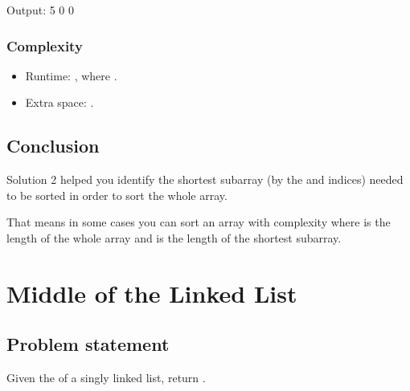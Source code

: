\documentclass[letterpaper,12pt,english]{book}
\begin{document}
\begin{sphinxVerbatim}[commandchars=\\\{\}]
Output:
5
0
0
\end{sphinxVerbatim}


\subsubsection{Complexity}
\label{\detokenize{Two_Pointers/08_TP_581_Shortest_Unsorted_Continuous_Subarray:id3}}\begin{itemize}
\item {} 
\sphinxAtStartPar
Runtime: , where .

\item {} 
\sphinxAtStartPar
Extra space: .

\end{itemize}


\subsection{Conclusion}
\label{\detokenize{Two_Pointers/08_TP_581_Shortest_Unsorted_Continuous_Subarray:conclusion}}
\sphinxAtStartPar
Solution 2 helped you identify the shortest subarray (by the  and  indices) needed to be sorted in order to sort the whole array.

\sphinxAtStartPar
That means in some cases you can sort an array with complexity  where  is the length of the whole array and  is the length of the shortest subarray.

\sphinxstepscope


\section{Middle of the Linked List}
\label{\detokenize{Two_Pointers/08_TP_876_Middle_of_the_Linked_List:middle-of-the-linked-list}}\label{\detokenize{Two_Pointers/08_TP_876_Middle_of_the_Linked_List::doc}}

\subsection{Problem statement\sphinxfootnotemark[110]}
\label{\detokenize{Two_Pointers/08_TP_876_Middle_of_the_Linked_List:problem-statement}}%
\begin{footnotetext}[110]\sphinxAtStartFootnote
{}
%
\end{footnotetext}\ignorespaces 
\sphinxAtStartPar
Given the  of a singly linked list, return .
\end{document}
